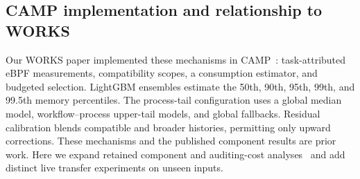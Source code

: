 \subsection{CAMP implementation and relationship to WORKS}
\label{sec:camp-implementation}
Our WORKS paper implemented these mechanisms in CAMP~\cite{camp2026works}:
task-attributed eBPF measurements, compatibility scopes, a consumption
estimator, and budgeted selection. LightGBM ensembles estimate the 50th,
90th, 95th, 99th, and 99.5th memory percentiles. The process-tail configuration
uses a global median model, workflow--process upper-tail models, and
global fallbacks. Residual calibration blends compatible and broader
histories, permitting only upward corrections. These mechanisms and the
published component results are prior work. Here we expand retained
component and auditing-cost analyses~\cite{campArtifact} and add distinct
live transfer experiments on unseen inputs.
